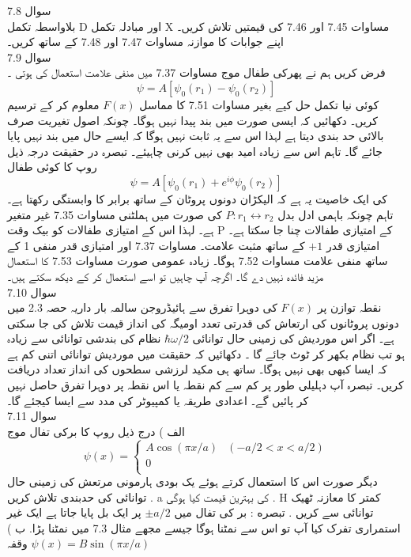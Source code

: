 سوال 
7.8\\
بلاواسطہ تکمل D اور مبادلہ تکمل X مساوات 7.45 اور 7.46 کی قیمتیں تلاش کریں۔ اپنے جوابات کا موازنہ مساوات 7.47 اور 7.48 کے ساتھ کریں۔ \\
سوال 
7.9\\
فرض کریں ہم نے پھرکی طفال موج مساوات 7.37 میں منفی علامت استعمال کی ہوتی ۔
\[\psi=A[\psi_{0}(r_{1})-\psi_{0}(r_{2})]\]
کوئی نیا تکمل حل کیے بغیر مساوات  7.51 کا مماسل
\( F(x)\) 
معلوم کر کے ترسیم کریں۔ دکھائیں کہ ایسی صورت میں بند پیدا نہیں ہوگا۔ چونکہ اصول تغیریت صرف بالائی حد بندی دیتا ہے لہذا اس سے یہ ثابت نہیں ہوگا کہ ایسے حال میں بند نہیں پایا جائے گا۔ تاہم اس سے زیادہ امید بھی نہیں کرنی چاہیئے۔ تبصرہ در حقیقت درجہ ذیل روپ کا کوئی طفال 
\[\psi=A[\psi_{0}(r_{1})+e^{i\phi}\psi_{0}(r_{2})]\]
کی ایک خاصیت یہ ہے کہ  الیکڑان دونوں پروٹان کے ساتھ برابر کا وابستگی رکھتا ہے۔ تاہم چونکہ باہمی ادل بدل 
\(P: r_{1}\leftrightarrow r_{2}\)
کی صورت میں ہملٹنی مساوات 7.35 غیر متغیر ہے۔ لہذا اس کے امتیازی طفالات کو بیک وقت P کے امتیازی طفالات چنا جا سکتا ہے۔ امتیازی قدر
\(+1\)
کے ساتھ مثبت علامت۔ مساوات 7.37 اور امتیازی قدر منفی 1 کے ساتھ منفی علامت مساوات 7.52 ہوگا۔ زیادہ عمومی صورت مساوات 7.53 کا استعمال مزید فائدہ نہیں دے گا۔ اگرچہ آپ چاہیں تو اسے استعمال کر کے دیکھ سکتے ہیں۔\\
سوال 
7.10\\
نقطہ توازن پر
\( F(x)\)
 کی دوہرا تفرق سے ہائیڈروجن سالمہ بار داریہ حصہ 2.3 میں دونوں پروٹانوں کی ارتعاش کی قدرتی تعدد اومیگہ کی انداز قیمت تلاش کی جا سکتی ہے۔ اگر اس موردیش کی زمینی حال توانائی 
 \(\hbar\omega/2\)
 نظام کی بندشی توانائی سے زیادہ ہو تب نظام بکھر کر ٹوٹ جائے گا ۔ دکھائیں کہ حقیقت میں موردیش توانائی اتنی کم ہے کہ ایسا کبھی بھی نہیں ہوگا۔ ساتھ ہی مکید لرزشی سطحوں کی انداز  تعداد دریافت کریں۔ تبصرہ 
آپ دہلیلی طور پر کم سے کم نقطہ یا اس نقطہ پر دوہرا تفرق حاصل نہیں کر پائیں گے۔ اعدادی طریقہ یا کمپیوٹر کی مدد سے  ایسا کیجئے گا۔\\
سوال 
7.11\\
الف ) درج ذیل روپ کا برکی تفال موج
\[\psi(x)=\begin{cases}
A\cos{(\pi x/a)} & (-a/2<x<a/2)\\
0\\
\end{cases}\]
دیگر صورت
اس کا استعمال کرتے ہوئے یک بودی ہارمونی مرتعش کی زمینی حال توانائی کی حدبندی تلاش کریں .  a کی بہترین قیمت کیا ہوگی . H کمتر کا معازنہ ٹھیک توانائی سے کریں .
تبصره : بر کی تفال میں
\(\pm a/2\)
پر ایک بل پایا جاتا ہے ایک غیر استمراری تفرک کیا آپ تو اس سے نمٹنا ہوگا جیسے مجھے مثال 7.3 میں نمٹنا پڑا.
ب ) وقفہ
\(\psi(x)=B\sin{(\pi x/a)}\)
